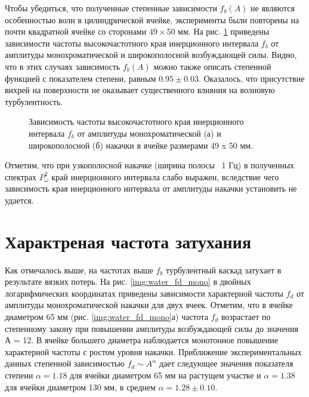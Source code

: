 Чтобы убедиться, что полученные степенные зависимости $f_b(A)$ не являются особенностью волн в цилиндрической 
ячейке, эксперименты были повторены на почти квадратной ячейке со сторонами $49 \times 50$ мм. На рис. \ref{img:water_fb_rect} приведены зависимости частоты высокочастотного края инерционного интервала $f_b$ от амплитуды монохроматической и широкополосной возбуждающей силы. Видно, что в этих случаях зависимость $f_b(A)$ можно также описать степенной функцией с показателем степени, равным $0.95 \pm 0.03$. Оказалось, что присутствие вихрей на поверхности не оказывает существенного влияния на волновую турбулентность.
\begin{figure}[ht]
  \begin{minipage}[ht]{0.49\linewidth}
  \end{minipage}
  \hfill
  \begin{minipage}[ht]{0.49\linewidth}
  \end{minipage}
  \caption{Зависимость частоты высокочастотного края инерционного интервала $f_b$ от амплитуды монохроматической (а) и широкополосной (б) накачки в ячейке размерами 49 x 50 мм.}
  \label{img:water_fb_rect}  
\end{figure}

Отметим, что при узкополосной накачке (ширина полосы ~1 Гц) в полученных спектрах $P^2_\omega$ край инерционного интервала слабо выражен, вследствие чего зависимость края инерционного интервала от амплитуды накачки установить не удается.

\section{Характреная частота затухания}%
Как отмечалось выше, на частотах выше $f_b$ турбулентный каскад затухает в результате вязких потерь. На рис. \ref{img:water_fd_mono} в двойных логарифмических координатах приведены зависимости характерной частоты $f_d$ от амплитуды монохроматической накачки для двух ячеек. Отметим, что в ячейке диаметром 65 мм (рис. \ref{img:water_fd_mono}а) частота $f_d$ возрастает по степенному закону при повышении амплитуды возбуждающей силы до значения А = 12. В ячейке большего диаметра наблюдается монотонное повышение характерной частоты с ростом уровня накачки. Приближение экспериментальных данных степенной зависимостью $f_d \sim A^\alpha$ дает следующее значения показателя степени $\alpha = 1.18$ для ячейки диаметром 65 мм на растущем участке и $\alpha = 1.38$ для ячейки диаметром 130 мм, в среднем $\alpha = 1.28 \pm 0.10$.

